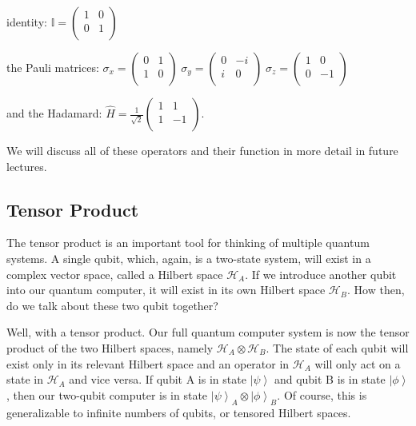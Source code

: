 \documentclass[11pt]{article} %
\newcommand{\ket}[1]{\left|#1\right\rangle}
\begin{document}
\noindent identity:
$\mathbb{I} = 
    \begin{pmatrix}
        1 & 0 \\
        0 & 1 \\
    \end{pmatrix}\nonumber$
    
\noindent the Pauli matrices: 
$\sigma_x = 
    \begin{pmatrix}
        0 & 1 \\
        1 & 0 \\
    \end{pmatrix}\;
    \sigma_y = 
    \begin{pmatrix}
        0 & -i \\
        i & 0 \\
    \end{pmatrix}\;
    \sigma_z = 
    \begin{pmatrix}
        1 & 0 \\
        0 & -1 \\
    \end{pmatrix}$
    
\noindent and the Hadamard:
$\hat{H} = \frac{1}{\sqrt{2}}
    \begin{pmatrix}
        1 & 1 \\
        1 & -1 \\
    \end{pmatrix}$.
    
\noindent We will discuss all of these operators and their function in more detail in future lectures.
    
\subsection{Tensor Product}
The tensor product is an important tool for thinking of multiple quantum systems. A single qubit, which, again, is a two-state system, will exist in a complex vector space, called a Hilbert space $\mathcal{H}_A$. If we introduce another qubit into our quantum computer, it will exist in its own Hilbert space $\mathcal{H}_B$. How then, do we talk about these two qubit together?

Well, with a tensor product. Our full quantum computer system is now the tensor product of the two Hilbert spaces, namely $\mathcal{H}_A \otimes \mathcal{H}_B$. The state of each qubit will exist only in its relevant Hilbert space and an operator in $\mathcal{H}_A$ will only act on a state in $\mathcal{H}_A$ and vice versa. If qubit A is in state $\ket{\psi}$ and qubit B is in state $\ket{\phi}$, then our two-qubit computer is in state $\ket{\psi}_A \otimes \ket{\phi}_B$. Of course, this is generalizable to infinite numbers of qubits, or tensored Hilbert spaces.
\end{document}
